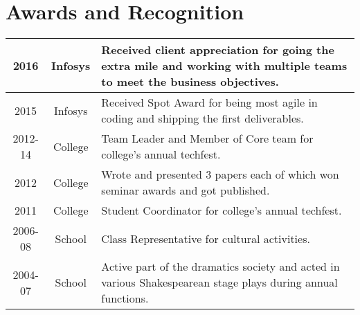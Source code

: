 \documentclass[]{deedy-resume-openfont}
\begin{document}
\begin{minipage}[t]{0.66\textwidth}




\section{Awards and Recognition} 
\begin{tabular}{|c|c|m{9cm}|}
\hline 2016 & Infosys & Received client appreciation for going the extra mile and working with multiple teams to meet the business objectives. \\ 
\hline 2015 & Infosys & Received Spot Award for being most agile in coding and shipping the first deliverables.  \\
\hline 2012-14 & College & Team Leader and Member of Core team for college's annual techfest. \\
\hline 2012 & College & Wrote and presented 3 papers each of which won seminar awards and got published. \\
\hline 2011 & College & Student Coordinator for college's annual techfest. \\
\hline 2006-08 & School & Class Representative for cultural activities. \\
\hline 2004-07 & School & Active part of the dramatics society and acted in various Shakespearean stage plays during annual functions. \\
\hline
\end{tabular}
\sectionsep


\end{minipage}
\end{document}
